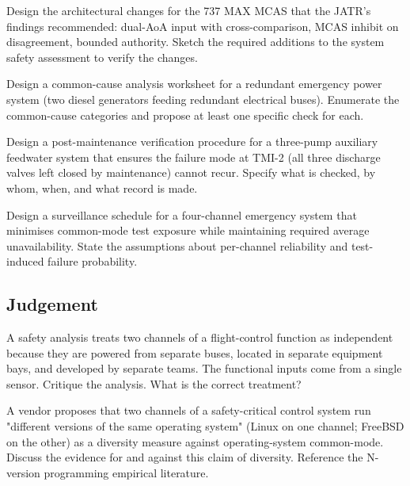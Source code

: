 \begin{exercise}
Design the architectural changes for the 737 MAX MCAS that the JATR's findings recommended: dual-AoA input with cross-comparison, MCAS inhibit on disagreement, bounded authority. Sketch the required additions to the system safety assessment to verify the changes.
\end{exercise}

\begin{exercise}
Design a common-cause analysis worksheet for a redundant emergency power system (two diesel generators feeding redundant electrical buses). Enumerate the common-cause categories and propose at least one specific check for each.
\end{exercise}

\begin{exercise}
Design a post-maintenance verification procedure for a three-pump auxiliary feedwater system that ensures the failure mode at TMI-2 (all three discharge valves left closed by maintenance) cannot recur. Specify what is checked, by whom, when, and what record is made.
\end{exercise}

\begin{exercise}
Design a surveillance schedule for a four-channel emergency system that minimises common-mode test exposure while maintaining required average unavailability. State the assumptions about per-channel reliability and test-induced failure probability.
\end{exercise}

\subsection*{Judgement}

\begin{exercise}
A safety analysis treats two channels of a flight-control function as independent because they are powered from separate buses, located in separate equipment bays, and developed by separate teams. The functional inputs come from a single sensor. Critique the analysis. What is the correct treatment?
\end{exercise}

\begin{exercise}
A vendor proposes that two channels of a safety-critical control system run "different versions of the same operating system" (Linux on one channel; FreeBSD on the other) as a diversity measure against operating-system common-mode. Discuss the evidence for and against this claim of diversity. Reference the N-version programming empirical literature.
\end{exercise}

